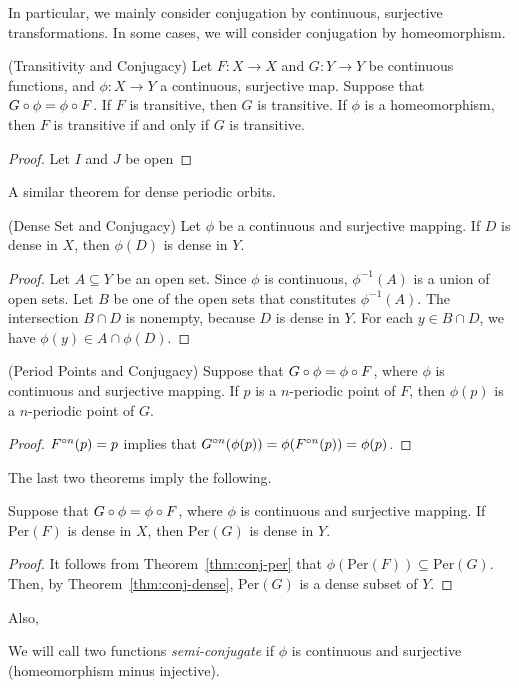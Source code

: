 \documentclass[12pt,draft,twoside]{article}
\begin{document}
In particular, we mainly consider conjugation by continuous, surjective transformations.
In some cases, we will consider conjugation by homeomorphism.
\begin{theorem}
  (Transitivity and Conjugacy) 
  Let $F: X \to X$ and $G: Y \to Y$ be continuous functions, and $\phi: X \to Y$ a continuous, surjective map.
  Suppose that $G \circ \phi = \phi \circ F$.
  If $F$ is transitive, then $G$ is transitive.
  If $\phi$ is a homeomorphism, then $F$ is transitive if and only if $G$ is transitive.
  \begin{proof}
    Let $I$ and $J$ be open 
    \end{proof}
\end{theorem}
A similar theorem for dense periodic orbits.
\begin{theorem}
  (Dense Set and Conjugacy) 
  Let $\phi$ be a continuous and surjective mapping.
  If $D$ is dense in $X$, then $\phi(D)$ is dense in $Y$.
  \label{thm:conj-dense}
  \begin{proof}
    Let $A \subseteq Y$ be an open set.
    Since $\phi$ is continuous, $\phi^{-1} (A)$ is a union of open sets.
    Let $B$ be one of the open sets that constitutes $\phi^{-1}(A)$.
    The intersection $B \cap D$ is nonempty, because $D$ is dense in $Y$.
    For each $y \in B \cap D$, we have $\phi(y) \in A \cap \phi(D)$.
  \end{proof}
\end{theorem}
\begin{theorem}
  (Period Points and Conjugacy)
  Suppose that $G \circ \phi = \phi \circ F$, where $\phi$ is continuous and surjective mapping.
  If $p$ is a $n$-periodic point of $F$, then $\phi(p)$ is a $n$-periodic point of $G$.
  \label{thm:conj-per}
  \begin{proof}
    $F^{\circ n}(p) = p$ implies that $G^{\circ n}(\phi(p)) = \phi(F^{\circ n}(p)) = \phi(p)$.
  \end{proof}
\end{theorem}
The last two theorems imply the following.
\begin{theorem}
  Suppose that $G \circ \phi = \phi \circ F$, where $\phi$ is continuous and surjective mapping.
  If $\mathrm{Per}(F)$ is dense in $X$, then $\mathrm{Per}(G)$ is dense in $Y$.
  \label{thm:conj-dense-per}
  \begin{proof}
    It follows from Theorem~\ref{thm:conj-per} that $\phi(\mathrm{Per}(F)) \subseteq \mathrm{Per}(G)$.
    Then, by Theorem~\ref{thm:conj-dense}, $\mathrm{Per}(G)$ is a dense subset of $Y$.
  \end{proof}
\end{theorem}
Also,
\begin{theorem}
  
  \label{thm:conj-sdic}
\end{theorem}

We will call two functions \textit{semi-conjugate} if $\phi$ is continuous and surjective (homeomorphism minus injective).




\printindex
\end{document}
